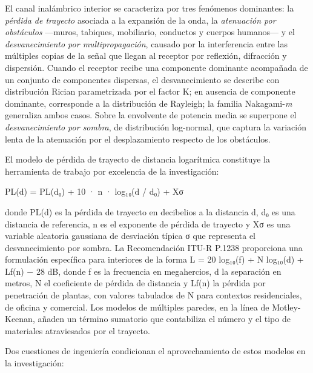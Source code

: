 \documentclass[
  12pt,
]{article}
\begin{document}
El canal inalámbrico interior se caracteriza por tres fenómenos
dominantes: la \emph{pérdida de trayecto} asociada a la expansión de la
onda, la \emph{atenuación por obstáculos} —muros, tabiques, mobiliario,
conductos y cuerpos humanos— y el \emph{desvanecimiento por
multipropagación}, causado por la interferencia entre las múltiples
copias de la señal que llegan al receptor por reflexión, difracción y
dispersión. Cuando el receptor recibe una componente dominante
acompañada de un conjunto de componentes dispersas, el desvanecimiento
se describe con distribución Rician parametrizada por el factor K; en
ausencia de componente dominante, corresponde a la distribución de
Rayleigh; la familia Nakagami-\emph{m} generaliza ambos casos. Sobre la
envolvente de potencia media se superpone el \emph{desvanecimiento por
sombra}, de distribución log-normal, que captura la variación lenta de
la atenuación por el desplazamiento respecto de los obstáculos.

El modelo de pérdida de trayecto de distancia logarítmica constituye la
herramienta de trabajo por excelencia de la investigación:

PL(d) = PL(d₀) + 10 · n · log₁₀(d / d₀) + Xσ

donde PL(d) es la pérdida de trayecto en decibelios a la distancia d, d₀
es una distancia de referencia, n es el exponente de pérdida de trayecto
y Xσ es una variable aleatoria gaussiana de desviación típica σ que
representa el desvanecimiento por sombra. La Recomendación ITU-R P.1238
proporciona una formulación específica para interiores de la forma L =
20 log₁₀(f) + N log₁₀(d) + Lf(n) − 28 dB, donde f es la frecuencia en
megahercios, d la separación en metros, N el coeficiente de pérdida de
distancia y Lf(n) la pérdida por penetración de plantas, con valores
tabulados de N para contextos residenciales, de oficina y comercial. Los
modelos de múltiples paredes, en la línea de Motley-Keenan, añaden un
término sumatorio que contabiliza el número y el tipo de materiales
atraviesados por el trayecto.

Dos cuestiones de ingeniería condicionan el aprovechamiento de estos
modelos en la investigación:
\end{document}
